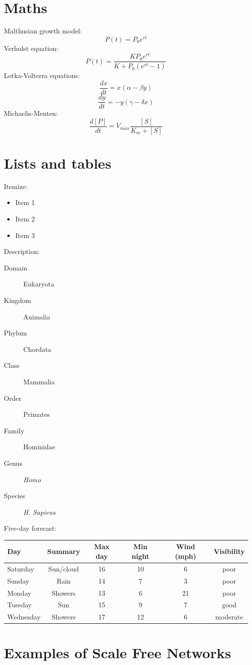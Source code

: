 \documentclass[a0,final]{a0poster}
\begin{document}
\begin{multicols}{3}
\section*{Maths}
Malthusian growth model:
$$P(t) = P_0 e^{rt}$$
Verhulst equation:
$$P(t) = \frac{K P_0 e^{rt}}{K + P_0 (e^{rt} - 1)}$$
Lotka-Volterra equations:
$$\frac{dx}{dt} = x(\alpha - \beta y)$$
$$\frac{dy}{dt} = - y(\gamma - \delta x)$$
Michaelis-Menten:
$$\frac{d[P]}{dt} = V_{max} \frac{[S]}{K_m + [S]}$$


\section*{Lists and tables}
Itemize:
\begin{itemize}
\item Item 1
\item Item 2
\item Item 3
\end{itemize}
\null
Description:
\begin{description}
\item[Domain] Eukaryota
\item[Kingdom] Animalia
\item[Phylum] Chordata
\item[Class] Mammalia
\item[Order] Primates
\item[Family] Hominidae
\item[Genus] \emph{Homo}
\item[Species] \emph{H. Sapiens}
\end{description}
\null
Five-day forecast:
\begin{center}
\begin{tabular}{lccccc}
Day & Summary & Max day & Min night & Wind (mph) & Visibility\\
\hline
Saturday & Sun/cloud & 16 & 10 & 6 & poor\\
Sunday & Rain & 14 & 7 & 3 & poor\\
Monday & Showers & 13 & 6 & 21 & poor\\
Tuesday & Sun & 15 & 9 & 7 & good\\
Wednesday & Showers & 17 & 12 & 6 &moderate
\end{tabular}
\end{center}


\columnbreak

\section*{Examples of Scale Free Networks}
\begin{figure}[p]


\end{figure}
\end{multicols}
\end{document}
